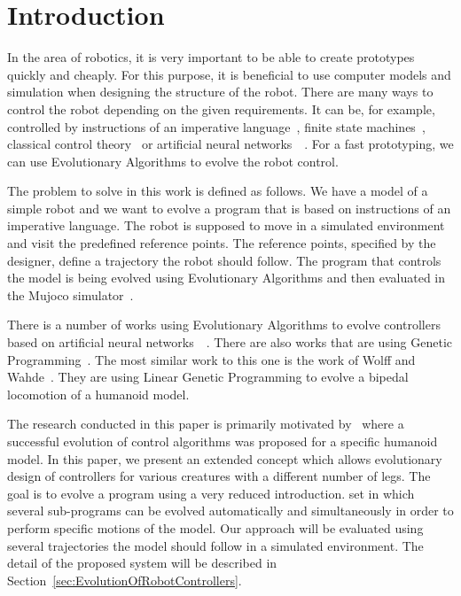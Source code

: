 \documentclass{ExcelAtFIT}
\affiliation{*%
  \href{mailto:xfajku06@stud.fit.vutbr.cz}{xfajku06@stud.fit.vutbr.cz},
  \textit{Faculty of Information Technology, Brno University of Technology}}
\begin{document}
\startdocument



\section{Introduction}
In the area of robotics, it is very important to be able to create prototypes quickly and cheaply.
For this purpose, it is beneficial to use computer models and simulation when designing the structure of the robot.
There are many ways to control the robot depending on the given requirements.
It can be, for example, controlled by instructions of an imperative language~\cite{Wolff2007}, finite state machines~\cite{Hodgins1996}, classical control theory~\cite{Mita1984} or artificial neural networks~\cite{Reil2002}~\cite{Lewis1996}.
For a fast prototyping, we can use Evolutionary Algorithms to evolve the robot control.

The problem to solve in this work is defined as follows.
We have a model of a simple robot and we want to evolve a program that is based on instructions of an imperative language.
The robot is supposed to move in a simulated environment and visit the predefined reference points.
The reference points, specified by the designer, define a trajectory the robot should follow.
The program that controls the model is being evolved using Evolutionary Algorithms and then evaluated in the Mujoco simulator~\cite{Todorov2012}.

There is a number of works using Evolutionary Algorithms to evolve controllers based on artificial neural networks~\cite{Randall1992}~\cite{Farooq2013}.
There are also works that are using Genetic Programming~\cite{Macedo2017}.
The most similar work to this one is the work of Wolff and Wahde~\cite{Wolff2007}.
They are using Linear Genetic Programming to evolve a bipedal locomotion of a humanoid model.

The research conducted in this paper is primarily motivated by~\cite{Wolff2007} where a successful evolution of
control algorithms was proposed for a specific humanoid model.
In this paper, we present an extended concept which allows evolutionary design of controllers for various creatures with a different number of legs.
The goal is to evolve a program using a very reduced introduction.
set in which several sub-programs can be evolved automatically and simultaneously in order to perform specific motions of the model.
Our approach will be evaluated using several trajectories the model should follow in a simulated environment.
The detail of the proposed system will be described in Section~\ref{sec:EvolutionOfRobotControllers}.
\end{document}
